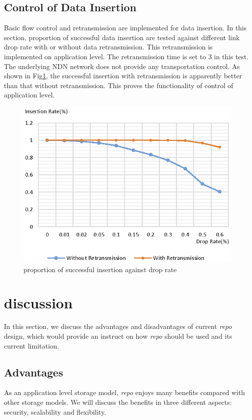 \documentclass[conference]{IEEEtran}
\begin{document}
\subsection{Control of Data Insertion}

Basic flow control and retransmission are implemented for data insertion. In this section, proportion of successful data insertion are tested against different link drop rate with or without data retransmission. This retransmission is implemented on application level. The retransmission time is set to 3 in this test. The underlying NDN network does not provide any transportation control. As shown in Fig\ref{drop-rate}, the successful insertion with retransmission is apparently better than that without retransmission. This proves the functionality of control of application level.

\begin{figure}[htbp]
\centering
\includegraphics{drop-rate.eps}
\caption{proportion of successful insertion against drop rate}
\label{drop-rate}
\end{figure}

\section{discussion} \label{section-discussion}

In this section, we discuss the advantages and disadvantages of current \emph{repo} design, which would provide an instruct on how \emph{repo} should be used and its current limitation.

\subsection{Advantages}
As an application level storage model, \emph{repo} enjoys many benefits compared with other storage models. We will discuss the benefits in three different aspects: security, scalability and flexibility.
\end{document}
